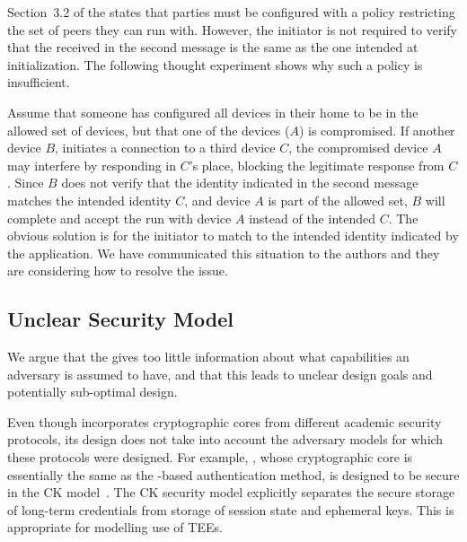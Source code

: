 \documentclass[runningheads, envcountsame, hidelinks, a4paper, draft, x11names]{llncs}
\begin{document}
Section~3.2 of the \mSpec{} states that parties must be configured
with a policy restricting the set of peers they can run \mEdhoc{} with.
%
However, the initiator is not required to verify that the \mIdcredr{} received
in the second message is the same as the one intended at initialization.
%
The following thought experiment shows why such a policy is insufficient.
%

Assume that someone has configured all devices in their home to be in the
allowed set of devices, but that one of the devices ($A$) is compromised.
%
If another device $B$, initiates a connection to a third device $C$, the
compromised device $A$ may interfere by responding in $C$'s place, blocking
the legitimate response from $C$.
%
Since $B$ does not verify that the identity indicated in the second message
matches the intended identity $C$, and device $A$ is part of the allowed set,
$B$ will complete and accept the \mEdhoc{} run with device $A$ instead of the
intended $C$.
%
The obvious solution is for the initiator to match \mIdcredr{} to the intended
identity indicated by the application.
%
We have communicated this situation to the \mEdhoc{} authors and they are considering
how to resolve the issue.
%

\subsection{Unclear Security Model}
%
We argue that the \mSpec{} gives too little information about what capabilities
an adversary is assumed to have, and that this leads to unclear design goals and
potentially sub-optimal design.
%
%

%
Even though \mEdhoc{} incorporates cryptographic cores from different academic
security protocols, its design does not take into account the adversary models
for which these protocols were designed.
%
For example, \mOptls{}, whose cryptographic core is essentially the same
as the \mStat{}-based authentication method, is designed to be secure in the CK
model~\cite{DBLP:conf/crypto/CanettiK02}.
%
The CK security model explicitly separates the secure storage of long-term
credentials from storage of session state and ephemeral keys.
%
This is appropriate for modelling use of TEEs.
%
\end{document}
